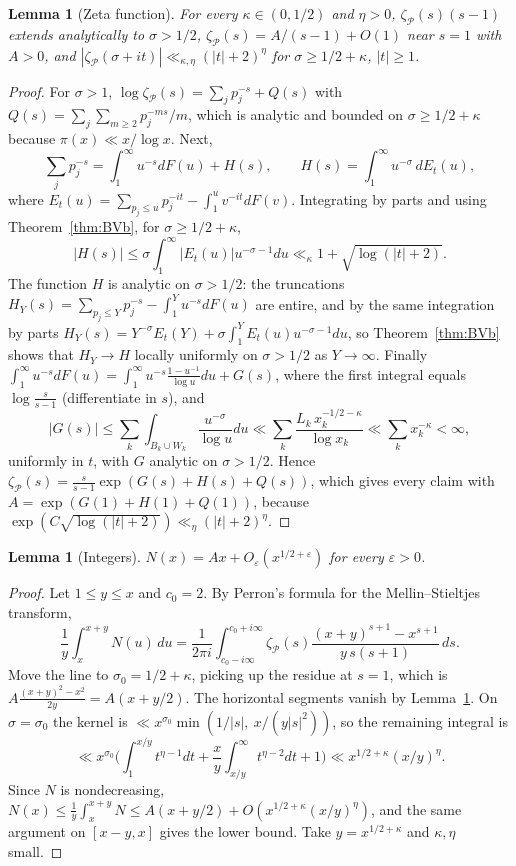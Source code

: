 \documentclass[11pt]{amsart}
\newtheorem{lemma}[theorem]{Lemma}
\theoremstyle{definition}
\theoremstyle{remark}
\begin{document}
\begin{lemma}[Zeta function]\label{lem:bzeta}
For every $\kappa\in(0,1/2)$ and $\eta>0$, $\zeta_{\mathcal P}(s)(s-1)$ extends analytically to $\sigma>1/2$, $\zeta_{\mathcal P}(s)=A/(s-1)+O(1)$ near $s=1$ with $A>0$, and $|\zeta_{\mathcal P}(\sigma+it)|\ll_{\kappa,\eta}(|t|+2)^{\eta}$ for $\sigma\ge 1/2+\kappa$, $|t|\ge1$.
\end{lemma}
\begin{proof}
For $\sigma>1$, $\log\zeta_{\mathcal P}(s)=\sum_j p_j^{-s}+Q(s)$ with $Q(s)=\sum_j\sum_{m\ge2}p_j^{-ms}/m$, which is analytic and bounded on $\sigma\ge1/2+\kappa$ because $\pi(x)\ll x/\log x$. Next,
\[
\sum_j p_j^{-s}=\int_1^\infty u^{-s}dF(u)+H(s),\qquad H(s)=\int_1^\infty u^{-\sigma}\,dE_t(u),
\]
where $E_t(u)=\sum_{p_j\le u}p_j^{-it}-\int_1^uv^{-it}dF(v)$. Integrating by parts and using Theorem~\ref{thm:BVb}, for $\sigma\ge1/2+\kappa$,
\[
|H(s)|\le\sigma\int_1^\infty|E_t(u)|u^{-\sigma-1}du\ll_\kappa 1+\sqrt{\log(|t|+2)}.
\]
The function $H$ is analytic on $\sigma>1/2$: the truncations $H_Y(s)=\sum_{p_j\le Y}p_j^{-s}-\int_1^Yu^{-s}dF(u)$ are entire, and by the same integration by parts $H_Y(s)=Y^{-\sigma}E_t(Y)+\sigma\int_1^YE_t(u)u^{-\sigma-1}du$, so Theorem~\ref{thm:BVb} shows that $H_Y\to H$ locally uniformly on $\sigma>1/2$ as $Y\to\infty$. Finally $\int_1^\infty u^{-s}dF(u)=\int_1^\infty u^{-s}\frac{1-u^{-1}}{\log u}du+G(s)$, where the first integral equals $\log\frac{s}{s-1}$ (differentiate in $s$), and
\[
|G(s)|\le\sum_k\int_{B_k\cup W_k}\frac{u^{-\sigma}}{\log u}du\ll\sum_k\frac{L_k\,x_k^{-1/2-\kappa}}{\log x_k}\ll\sum_k x_k^{-\kappa}<\infty,
\]
uniformly in $t$, with $G$ analytic on $\sigma>1/2$. Hence $\zeta_{\mathcal P}(s)=\frac{s}{s-1}\exp(G(s)+H(s)+Q(s))$, which gives every claim with $A=\exp(G(1)+H(1)+Q(1))$, because $\exp(C\sqrt{\log(|t|+2)})\ll_\eta(|t|+2)^\eta$.
\end{proof}

\begin{lemma}[Integers]\label{lem:bN}
$N(x)=Ax+O_\varepsilon(x^{1/2+\varepsilon})$ for every $\varepsilon>0$.
\end{lemma}
\begin{proof}
Let $1\le y\le x$ and $c_0=2$. By Perron's formula for the Mellin--Stieltjes transform,
\[
\frac1y\int_x^{x+y}N(u)\,du=\frac1{2\pi i}\int_{c_0-i\infty}^{c_0+i\infty}\zeta_{\mathcal P}(s)\frac{(x+y)^{s+1}-x^{s+1}}{y\,s(s+1)}\,ds .
\]
Move the line to $\sigma_0=1/2+\kappa$, picking up the residue at $s=1$, which is $A\frac{(x+y)^2-x^2}{2y}=A(x+y/2)$. The horizontal segments vanish by Lemma~\ref{lem:bzeta}. On $\sigma=\sigma_0$ the kernel is $\ll x^{\sigma_0}\min(1/|s|,\ x/(y|s|^2))$, so the remaining integral is
\[
\ll x^{\sigma_0}\Big(\int_{1}^{x/y}t^{\eta-1}dt+\frac xy\int_{x/y}^\infty t^{\eta-2}dt+1\Big)\ll x^{1/2+\kappa}(x/y)^{\eta}.
\]
Since $N$ is nondecreasing, $N(x)\le\frac1y\int_x^{x+y}N\le A(x+y/2)+O(x^{1/2+\kappa}(x/y)^\eta)$, and the same argument on $[x-y,x]$ gives the lower bound. Take $y=x^{1/2+\kappa}$ and $\kappa,\eta$ small.
\end{proof}
\end{document}
